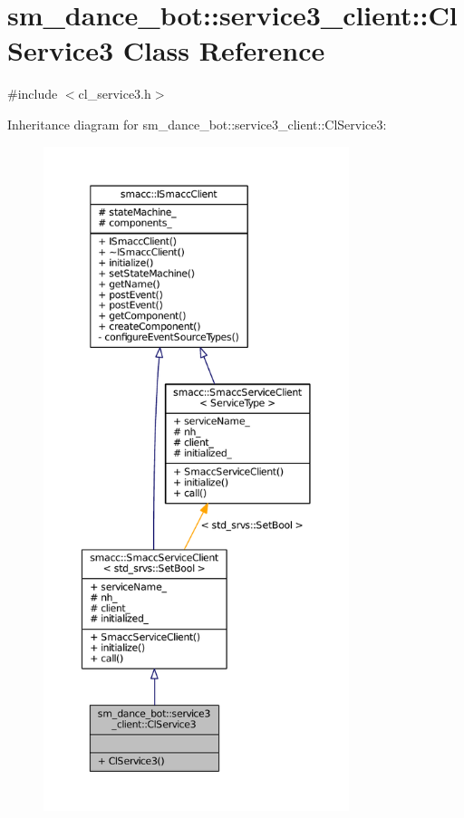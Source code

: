 \hypertarget{classsm__dance__bot_1_1service3__client_1_1ClService3}{}\section{sm\+\_\+dance\+\_\+bot\+:\+:service3\+\_\+client\+:\+:Cl\+Service3 Class Reference}
\label{classsm__dance__bot_1_1service3__client_1_1ClService3}


{\ttfamily \#include $<$cl\+\_\+service3.\+h$>$}



Inheritance diagram for sm\+\_\+dance\+\_\+bot\+:\+:service3\+\_\+client\+:\+:Cl\+Service3\+:
\nopagebreak
\begin{figure}[H]
\begin{center}
\leavevmode
\includegraphics[height=550pt]{classsm__dance__bot_1_1service3__client_1_1ClService3__inherit__graph}
\end{center}
\end{figure}


